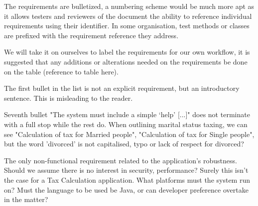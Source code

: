 The requirements are bulletized, a numbering scheme would be much more apt as it allows testers and reviewers of the document the ability to reference individual requirements using their identifier. In some organisation, test methods or classes are prefixed with the requirement reference they address. 

We will take it on ourselves to label the requirements for our own workflow, it is suggested that any additions or alterations needed on the requirements be done on the table (reference to table here).



The first bullet in the list is not an explicit requirement, but an introductory sentence. This is misleading to the reader. 

Seventh bullet "The system must include a simple ‘help’ [...]" does not terminate with a full stop while the rest do. 
When outlining marital status taxing, we can see "Calculation of tax for Married people", "Calculation of tax for Single people", but the word 'divorced' is not capitalised, typo or lack of respect for divorced?  

The only non-functional requirement related to the application's robustness. Should we assume there is no interest in security, performance? Surely this isn't the case for a Tax Calculation application. What platforms must the system run on? Must the language to be used be Java, or can developer preference overtake in the matter? 
\par





